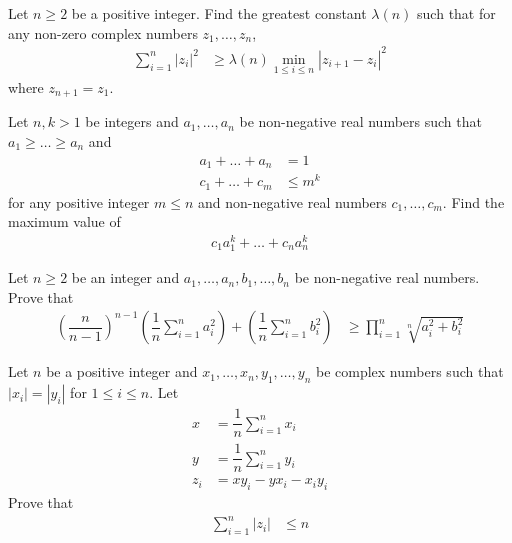\documentclass{subfile}
\begin{document}
		\begin{problem}
			Let $n\geq2$ be a positive integer. Find the greatest constant $\lambda(n)$ such that for any non-zero complex numbers $z_{1},\ldots,z_{n}$,
				\begin{align*}
					\sum_{i=1}^{n}|z_{i}|^{2}
						& \geq \lambda(n)\min\limits_{1\leq i\leq n}|z_{i+1}-z_{i}|^{2}
				\end{align*}
			where $z_{n+1}=z_{1}$.
		\end{problem}
	
		\begin{problem}
			Let $n,k>1$ be integers and $a_{1},\ldots,a_{n}$ be non-negative real numbers such that $a_{1}\geq\ldots\geq a_{n}$ and
				\begin{align*}
					a_{1}+\ldots+a_{n}
						& = 1\\
					c_{1}+\ldots+c_{m}
						& \leq m^{k}
				\end{align*}
			for any positive integer $m\leq n$ and non-negative real numbers $c_{1},\ldots,c_{m}$. Find the maximum value of
				\begin{align*}
					c_{1}a_{1}^{k}+\ldots+c_{n}a_{n}^{k}
				\end{align*}
		\end{problem}
	
		\begin{problem}
			Let $n\geq2$ be an integer and $a_{1},\ldots,a_{n},b_{1},\ldots,b_{n}$ be non-negative real numbers. Prove that
				\begin{align*}
					\left(\dfrac{n}{n-1}\right)^{n-1}\left(\dfrac{1}{n}\sum_{i=1}^{n}a_{i}^{2}\right)+\left(\dfrac{1}{n}\sum_{i=1}^{n}b_{i}^{2}\right)
						& \geq \prod_{i=1}^{n}\sqrt[n]{a_{i}^{2}+b_{i}^{2}}
				\end{align*}
		\end{problem}
	
		\begin{problem}
			Let $n$ be a positive integer and $x_{1},\ldots,x_{n},y_{1},\ldots,y_{n}$ be complex numbers such that $|x_{i}|=|y_{i}|$ for $1\leq i\leq n$. Let
				\begin{align*}
					x
						& = \dfrac{1}{n}\sum_{i=1}^{n}x_{i}\\
					y
						& = \dfrac{1}{n}\sum_{i=1}^{n}y_{i}\\
					z_{i}
						& = xy_{i}-yx_{i}-x_{i}y_{i}
				\end{align*}
			Prove that
				\begin{align*}
					\sum_{i=1}^{n}|z_{i}|
						& \leq n
				\end{align*}
		\end{problem}
	
\end{document}
